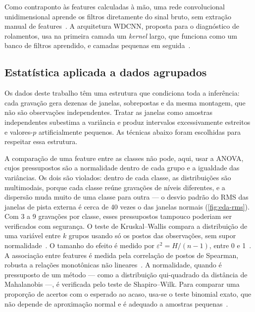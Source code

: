 Como contraponto às features
calculadas à mão, uma rede convolucional unidimensional aprende os filtros
diretamente do sinal bruto, sem extração manual de features~\cite[cap.~9]{goodfellow2016}. A arquitetura
WDCNN, proposta para o diagnóstico de rolamentos, usa na primeira camada um
\emph{kernel} largo, que funciona como um banco de filtros aprendido, e
camadas pequenas em seguida~\cite{zhang2017}.

\subsection{Estatística aplicada a dados agrupados}
\label{sec:tec-estatistica}

Os dados deste trabalho têm uma estrutura que condiciona toda a inferência: cada
gravação gera dezenas de janelas, sobrepostas e da mesma montagem, que não são
observações independentes. Tratar as janelas como amostras independentes
subestima a variância e produz intervalos excessivamente estreitos e valores-$p$
artificialmente pequenos. As técnicas abaixo foram escolhidas para respeitar essa estrutura.

A comparação de uma feature entre as classes não pode, aqui, usar a ANOVA,
cujos pressupostos são a normalidade dentro de cada grupo e a igualdade das
variâncias. Os dois são violados: dentro de cada classe, as distribuições são
multimodais, porque cada classe reúne gravações de níveis diferentes, e a
dispersão muda muito de uma classe para outra --- o desvio padrão do RMS das
janelas de pista externa é cerca de 40 vezes o das janelas normais
(\autoref{fig:eda-rms}). Com 3 a 9 gravações por classe, esses pressupostos
tampouco poderiam ser verificados com segurança. O teste de
Kruskal--Wallis compara a distribuição de uma variável entre $k$ grupos usando só
os postos das observações, sem supor normalidade~\cite{hollander2014}.
O tamanho do efeito é medido por $\varepsilon^2 = H/(n-1)$, entre 0 e
1~\cite{hollander2014}. A associação entre features é medida pela correlação de
postos de Spearman, robusta a relações monotônicas não
lineares~\cite{hollander2014}. A normalidade, quando é pressuposto de
um método --- como a distribuição qui-quadrado da distância de Mahalanobis ---, é
verificada pelo teste de Shapiro--Wilk. Para comparar uma proporção de
acertos com o esperado ao acaso, usa-se o teste binomial exato, que não depende
de aproximação normal e é adequado a amostras pequenas~\cite{hollander2014}.

